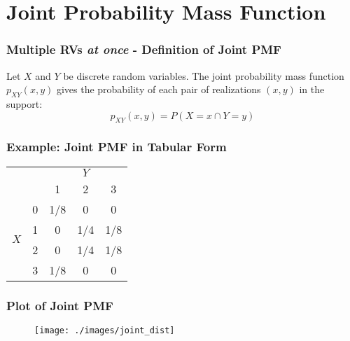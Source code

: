\section{Joint Probability Mass Function}

\begin{frame}
  \frametitle{Multiple RVs \emph{at once} - Definition of Joint PMF}
Let $X$ and $Y$ be discrete random variables. The joint probability mass function $p_{XY}(x,y)$ gives the probability of each pair of realizations $(x,y)$ in the support:
\Large
 $$\boxed{p_{XY}(x,y) = P(X = x \cap Y=y)}$$

\end{frame}
\begin{frame}
\frametitle{Example: Joint PMF in Tabular Form}

\begin{table}
\begin{tabular}{|cc|ccc|}
\hline
&&\multicolumn{3}{c|}{$Y$}\\
&&1 & 2&3\\
\hline
\multirow{4}{*}{$X$}
&0& \multicolumn{1}{|c}{\alert{1/8}} & \alert{0}& \alert{0}\\
&1& \multicolumn{1}{|c}{\alert{0}} & \alert{1/4}&\alert{1/8}\\
&2& \multicolumn{1}{|c}{\alert{0}} & \alert{1/4}&\alert{1/8}\\
&3& \multicolumn{1}{|c}{\alert{1/8}} & \alert{0}&\alert{0}\\
\hline
\end{tabular}
\end{table}

\end{frame}
\begin{frame}
\frametitle{Plot of Joint PMF}
\begin{figure}
	\texttt{[image: ./images/joint\_dist]}
\end{figure}

\end{frame}




